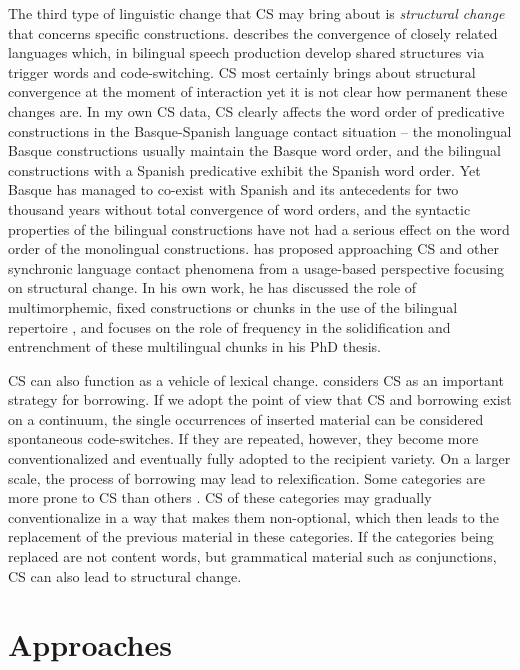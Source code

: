 \documentclass[output=paper,
modfonts
]{langscibook}
\begin{document}
The third type of linguistic change that CS may bring about is \textit{structural change} that concerns specific constructions. \cite{clyne1967transference,clyne2003dynamics} describes the convergence of closely related languages which, in bilingual speech production develop shared structures via trigger words and code-switching. CS most certainly brings about structural convergence at the moment of interaction \parencite{frick2013emergent,riionheimo2014emergence} yet it is not clear how permanent these changes are. In my own CS data, CS clearly affects the word order of predicative constructions in the Basque-Spanish language contact situation – the monolingual Basque constructions usually maintain the Basque word order, and the bilingual constructions with a Spanish predicative exhibit the Spanish word order. Yet Basque has managed to co-exist with Spanish and its antecedents for two thousand years without total convergence of word orders, and the syntactic properties of the bilingual constructions have not had a serious effect on the word order of the monolingual constructions.  \cite{backus2015usage} has proposed approaching CS and other synchronic language contact phenomena from a usage-based perspective focusing on structural change. In his own work, he has discussed the role of multimorphemic, fixed constructions or chunks in the use of the bilingual repertoire \parencite{backus2003units}, and \cite{hakimov2016plural} focuses on the role of frequency in the solidification and entrenchment of these multilingual chunks in his PhD thesis. 

CS can also function as a vehicle of lexical change. \cite{thomason2001contact} considers CS as an important strategy for borrowing. If we adopt the point of view that CS and borrowing exist on a continuum, the single occurrences of inserted material can be considered spontaneous code-switches. If they are repeated, however, they become more conventionalized and eventually fully adopted to the recipient variety. On a larger scale, the process of borrowing may lead to relexification. Some categories are more prone to CS than others \cite[pp. 133]{matras2009language}. CS of these categories may gradually conventionalize in a way that makes them non-optional, which then leads to the replacement of the previous material in these categories. If the categories being replaced are not content words, but grammatical material such as conjunctions, CS can also lead to structural change.

\section{Approaches}
\end{document}
